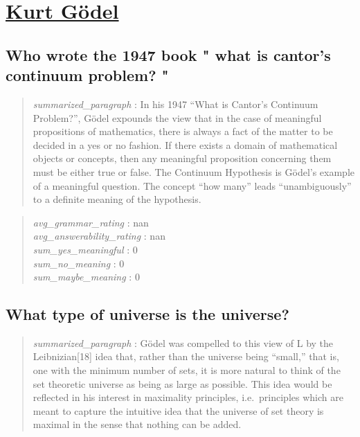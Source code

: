 \hypertarget{kurt-guxf6del}{%
\section{\texorpdfstring{\href{https://plato.stanford.edu/entries/goedel/index.html}{Kurt
Gödel}}{Kurt Gödel}}\label{kurt-guxf6del}}

\hypertarget{who-wrote-the-1947-book-what-is-cantors-continuum-problem}{%
\subsection{Who wrote the 1947 book " what is cantor's continuum
problem?
"}\label{who-wrote-the-1947-book-what-is-cantors-continuum-problem}}

\begin{quote}
\emph{summarized\_paragraph} : In his 1947 ``What is Cantor's Continuum
Problem?'', Gödel expounds the view that in the case of meaningful
propositions of mathematics, there is always a fact of the matter to be
decided in a yes or no fashion. If there exists a domain of mathematical
objects or concepts, then any meaningful proposition concerning them
must be either true or false. The Continuum Hypothesis is Gödel's
example of a meaningful question. The concept ``how many'' leads
``unambiguously'' to a definite meaning of the hypothesis.
\end{quote}

\begin{quote}
\emph{avg\_grammar\_rating} : nan\\
\emph{avg\_answerability\_rating} : nan\\
\emph{sum\_yes\_meaningful} : 0\\
\emph{sum\_no\_meaning} : 0\\
\emph{sum\_maybe\_meaning} : 0
\end{quote}

\hypertarget{what-type-of-universe-is-the-universe}{%
\subsection{What type of universe is the
universe?}\label{what-type-of-universe-is-the-universe}}

\begin{quote}
\emph{summarized\_paragraph} : Gödel was compelled to this view of L by
the Leibnizian{[}18{]} idea that, rather than the universe being
``small,'' that is, one with the minimum number of sets, it is more
natural to think of the set theoretic universe as being as large as
possible. This idea would be reflected in his interest in maximality
principles, i.e.~principles which are meant to capture the intuitive
idea that the universe of set theory is maximal in the sense that
nothing can be added.
\end{quote}

